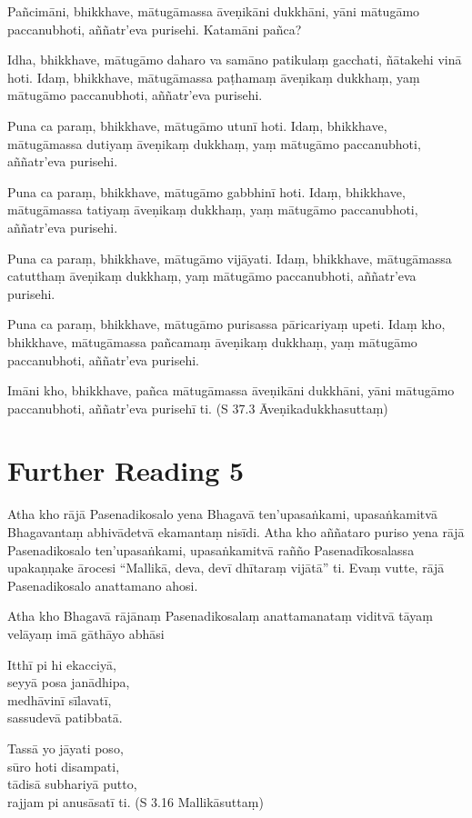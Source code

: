 Pañcimāni, bhikkhave, mātugāmassa āveṇikāni dukkhāni, yāni mātugāmo paccanubhoti, aññatr’eva purisehi. Katamāni pañca?

Idha, bhikkhave, mātugāmo daharo va samāno patikulaṃ gacchati, ñātakehi vinā hoti. Idaṃ, bhikkhave, mātugāmassa paṭhamaṃ āveṇikaṃ dukkhaṃ, yaṃ mātugāmo paccanubhoti, aññatr’eva purisehi.

Puna ca paraṃ, bhikkhave, mātugāmo utunī hoti. Idaṃ, bhikkhave, mātugāmassa dutiyaṃ āveṇikaṃ dukkhaṃ, yaṃ mātugāmo paccanubhoti, aññatr’eva purisehi.

Puna ca paraṃ, bhikkhave, mātugāmo gabbhinī hoti. Idaṃ, bhikkhave, mātugāmassa tatiyaṃ āveṇikaṃ dukkhaṃ, yaṃ mātugāmo paccanubhoti, aññatr’eva purisehi.

Puna ca paraṃ, bhikkhave, mātugāmo vijāyati. Idaṃ, bhikkhave, mātugāmassa catutthaṃ āveṇikaṃ dukkhaṃ, yaṃ mātugāmo paccanubhoti, aññatr’eva purisehi.

Puna ca paraṃ, bhikkhave, mātugāmo purisassa pāricariyaṃ upeti. Idaṃ kho, bhikkhave, mātugāmassa pañcamaṃ āveṇikaṃ dukkhaṃ, yaṃ mātugāmo paccanubhoti, aññatr’eva purisehi.

Imāni kho, bhikkhave, pañca mātugāmassa āveṇikāni dukkhāni, yāni mātugāmo paccanubhoti, aññatr’eva purisehī ti. (S 37.3 Āveṇikadukkhasuttaṃ)

\section*{Further Reading 5}

Atha kho rājā Pasenadikosalo yena Bhagavā ten’upasaṅkami, upasaṅkamitvā Bhagavantaṃ abhivādetvā ekamantaṃ nisīdi. Atha kho aññataro puriso yena rājā Pasenadikosalo ten’upasaṅkami, upasaṅkamitvā rañño Pasenadīkosalassa upakaṇṇake ārocesi “Mallikā, deva, devī dhītaraṃ vijātā” ti. Evaṃ vutte, rājā Pasenadikosalo anattamano ahosi.

Atha kho Bhagavā rājānaṃ Pasenadikosalaṃ anattamanataṃ viditvā tāyaṃ velāyaṃ imā gāthāyo abhāsi

Itthī pi hi ekacciyā,\\
seyyā posa janādhipa,\\
medhāvinī sīlavatī,\\
sassudevā patibbatā.

Tassā yo jāyati poso,\\
sūro hoti disampati,\\
tādisā subhariyā putto,\\
rajjam pi anusāsatī ti. (S 3.16 Mallikāsuttaṃ)